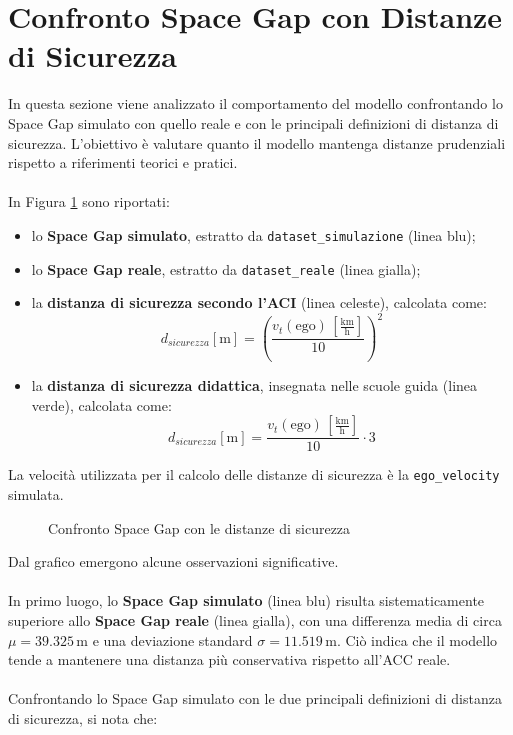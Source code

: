 \section{Confronto Space Gap con Distanze di Sicurezza}
In questa sezione viene analizzato il comportamento del modello confrontando lo 
Space Gap simulato con quello reale e con le principali definizioni di distanza di sicurezza. 
L'obiettivo è valutare quanto il modello mantenga distanze prudenziali rispetto a riferimenti teorici e pratici.
\\\\
\noindent In Figura \ref{fig:security_distance} sono riportati:
\begin{itemize}
    \item lo \textbf{Space Gap simulato}, estratto da \texttt{dataset\_simulazione} (linea blu);
    \item lo \textbf{Space Gap reale}, estratto da \texttt{dataset\_reale} (linea gialla);
    \item la \textbf{distanza di sicurezza secondo l'ACI} \cite{distanza_di_sicurezza_aci} (linea celeste), calcolata come:
    \[
        d_{sicurezza}[\mathrm{m}] = \left( \frac{v_t(\mathrm{ego}) \, [\frac{\mathrm{km}}{\mathrm{h}}]}{10} \right)^2
    \]
    \item la \textbf{distanza di sicurezza didattica}, insegnata nelle 
    scuole guida \cite{distanza_di_sicurezza_patente} (linea verde), calcolata come:
    \[
        d_{sicurezza}[\mathrm{m}] = \frac{v_t(\mathrm{ego}) \, [\frac{\mathrm{km}}{\mathrm{h}}]}{10} \cdot 3
    \]
\end{itemize}

\noindent La velocità utilizzata per il calcolo delle distanze di sicurezza è la \texttt{ego\_velocity} simulata.

\begin{figure}[H]
    \centering
    \caption{Confronto Space Gap con le distanze di sicurezza}
    \label{fig:security_distance}
\end{figure}
\noindent Dal grafico emergono alcune osservazioni significative.  
\\\\
\noindent In primo luogo, lo  \textbf{Space Gap simulato} (linea blu) risulta sistematicamente superiore 
allo  \textbf{Space Gap reale} (linea gialla), con una differenza media di circa \(\mu = 39.325 \, \mathrm{m}\) 
e una deviazione standard \(\sigma = 11.519 \, \mathrm{m}\).  
Ciò indica che il modello tende a mantenere una distanza più conservativa rispetto all'ACC reale.
\\\\
\noindent Confrontando lo Space Gap simulato con le due principali definizioni di distanza di sicurezza, si nota che:

